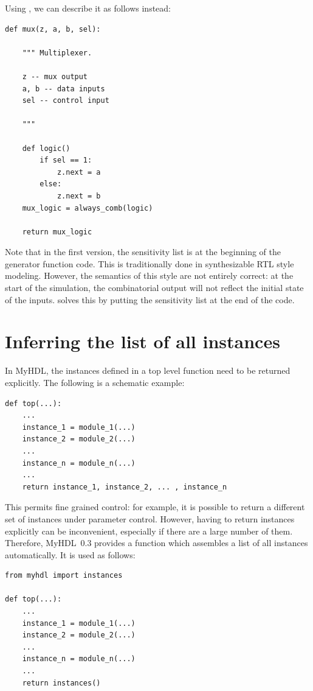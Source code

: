 \documentclass{howto}
\newcommand{\myhdl}{\protect \mbox{MyHDL}}
\begin{document}
Using , we can describe it as follows instead:

\begin{verbatim}
def mux(z, a, b, sel):

    """ Multiplexer.
    
    z -- mux output
    a, b -- data inputs
    sel -- control input

    """

    def logic()
        if sel == 1:
            z.next = a
        else:
            z.next = b
    mux_logic = always_comb(logic)

    return mux_logic
\end{verbatim}

Note that in the first version, the sensitivity list is at the beginning of
the generator function code. This is traditionally done in
synthesizable RTL style modeling. However, the semantics of this style
are not entirely correct: at the start of the simulation, the
combinatorial output will not reflect the initial state of the
inputs.  solves this by putting the sensitivity
list at the end of the code.

\section{Inferring the list of all instances\label{section-instances}}

In \myhdl{}, the instances defined in a top level function
need to be returned explicitly. The following is a schematic
example:

\begin{verbatim}
def top(...):
    ...
    instance_1 = module_1(...)
    instance_2 = module_2(...)
    ...
    instance_n = module_n(...)
    ... 
    return instance_1, instance_2, ... , instance_n
\end{verbatim}


This permits fine grained control: for example, it
is possible to return a different set of instances
under parameter control. 
However, having to return instances explicitly can be inconvenient,
especially if there are a large number of them. Therefore, \myhdl\ 0.3
provides a function  which assembles a list of
all instances automatically. It is used as follows:

\begin{verbatim}
from myhdl import instances

def top(...):
    ...
    instance_1 = module_1(...)
    instance_2 = module_2(...)
    ...
    instance_n = module_n(...)
    ...
    return instances()
\end{verbatim}
\end{document}
